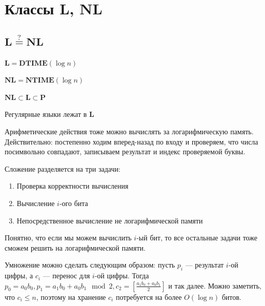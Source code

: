 
\section{Классы \(\mathbf{L}\), \(\mathbf{NL}\)}
\subsection{\(\mathbf{L} \stackrel{?}{=} \mathbf{NL}\)}

\begin{definition}
    \(\mathbf{L} = \mathbf{DTIME}(\log n)\)
\end{definition}

\begin{definition}
    \(\mathbf{NL} = \mathbf{NTIME}(\log n)\)
\end{definition}

\begin{note}
    \(\mathbf{NL} \subset \mathbf{L} \subset \mathbf{P}\)
\end{note}

\begin{note}
    Регулярные языки лежат в \(\mathbf{L}\)
\end{note}

\begin{note}
    Арифметические действия тоже можно вычислять за логарифмическую память. Действительно: постепенно ходим вперед-назад по входу и проверяем, что числа посимвольно совпадают, записываем результат и индекс проверяемой буквы.

    Сложение разделяется на три задачи:
    \begin{enumerate}
        \item Проверка корректности вычисления
        \item Вычисление \(i\)-ого бита
        \item Непосредственное вычисление не логарифмической памяти
    \end{enumerate}

    Понятно, что если мы можем вычислить \(i\)-ый бит, то все остальные задачи тоже сможем решить на логарифмической памяти.

    Умножение можно сделать следующим образом: пусть \(p_i\) --- результат \(i\)-ой цифры, а \(c_i\) --- перенос для \(i\)-ой цифры. Тогда \(p_0 = a_0b_0, p_1 = a_1b_0 + a_0b_1 \mod 2, c_2 = \left[ \frac{a_1b_0 + a_0b_1}{2} \right]\) и так далее. Можно заметить, что \(c_i \le n\), поэтому на хранение \(c_i\) потребуется на более \(O(\log n)\) битов.
\end{note}

